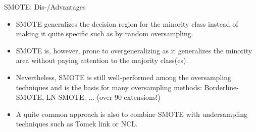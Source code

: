 \documentclass[11pt,compress,t,notes=noshow, xcolor=table]{beamer}
\begin{document}
	\begin{frame}{SMOTE: Dis-/Advantages}

		\small

		\begin{itemize}
		
			\item SMOTE generalizes the decision region for the minority class instead of making it quite specific such as by random oversampling. 
            \vspace{10pt}
		
			\item SMOTE is, however, prone to overgeneralizing as it generalizes the minority area without paying attention to the majority class(es).
            \vspace{10pt}

		
			\item Nevertheless, SMOTE is still well-performed among the oversampling techniques and is the basis for many oversampling methods: Borderline-SMOTE, LN-SMOTE, $\ldots$ (over 90 extensions!)
            \vspace{10pt}

			\item A quite common approach is also to combine SMOTE with undersampling techniques such as Tomek link or NCL.

		\end{itemize}		

	\end{frame}


	\endlecture
\end{document}
